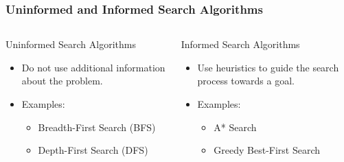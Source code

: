 \documentclass[aspectratio=169]{beamer}
\begin{document}
\begin{frame}[fragile]
    \frametitle{Uninformed and Informed Search Algorithms}
    \begin{columns}
            \begin{block}{Uninformed Search Algorithms}
                \begin{itemize}
                    \item Do not use additional information about the problem.
                    \item Examples: 
                    \begin{itemize}
                        \item Breadth-First Search (BFS)
                        \item Depth-First Search (DFS)
                    \end{itemize}
                \end{itemize}
            \end{block}
            \begin{block}{Informed Search Algorithms}
                \begin{itemize}
                    \item Use heuristics to guide the search process towards a goal.
                    \item Examples:
                    \begin{itemize}
                        \item A* Search
                        \item Greedy Best-First Search
                    \end{itemize}
                \end{itemize}
            \end{block}
    \end{columns}
\end{frame}
\end{document}
